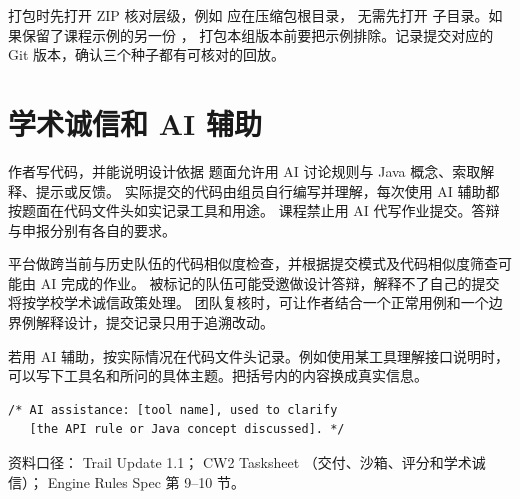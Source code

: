 \documentclass[UTF8,11pt,a4paper]{ctexart}
\begin{document}
\noindent 打包时先打开 ZIP 核对层级，例如  应在压缩包根目录，
无需先打开  子目录。如果保留了课程示例的另一份 ，
打包本组版本前要把示例排除。记录提交对应的 Git 版本，确认三个种子都有可核对的回放。

\section{学术诚信和 AI 辅助}

\begin{warnbox}{作者写代码，并能说明设计依据}
题面允许用 AI 讨论规则与 Java 概念、索取解释、提示或反馈。
实际提交的代码由组员自行编写并理解，每次使用 AI 辅助都按题面在代码文件头如实记录工具和用途。
课程禁止用 AI 代写作业提交。答辩与申报分别有各自的要求。
\end{warnbox}

平台做跨当前与历史队伍的代码相似度检查，并根据提交模式及代码相似度筛查可能由 AI 完成的作业。
被标记的队伍可能受邀做设计答辩，解释不了自己的提交将按学校学术诚信政策处理。
团队复核时，可让作者结合一个正常用例和一个边界例解释设计，提交记录只用于追溯改动。

\noindent 若用 AI 辅助，按实际情况在代码文件头记录。例如使用某工具理解接口说明时，
可以写下工具名和所问的具体主题。把括号内的内容换成真实信息。
\begin{lstlisting}
/* AI assistance: [tool name], used to clarify
   [the API rule or Java concept discussed]. */
\end{lstlisting}

\medskip
\noindent 资料口径： Trail Update 1.1； CW2 Tasksheet
（交付、沙箱、评分和学术诚信）； Engine Rules Spec 第 9--10 节。
\end{document}
